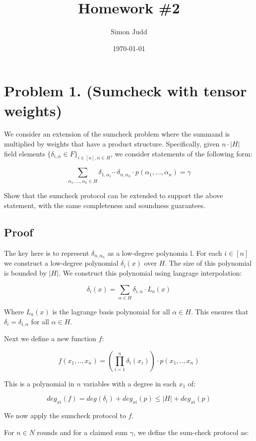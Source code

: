 \documentclass{article}
\title{Homework \#2}
\author{Simon Judd}
\date{\today}
\begin{document}
\maketitle

\section*{Problem 1. (Sumcheck with tensor weights)}

We consider an extension of the sumcheck problem where the summand is multiplied by weights that have a product structure. Specifically, given $n \cdot |H|$ field elements $\{\delta_{i,\alpha} \in F\}_{i\in[n],\alpha\in H}$, we consider statements of the following form:

\[
\sum_{\alpha_1,\ldots,\alpha_n \in H} \delta_{1,\alpha_1} \cdots \delta_{n,\alpha_n} \cdot p(\alpha_1, \ldots, \alpha_n) = \gamma
\]

Show that the sumcheck protocol can be extended to support the above statement, with the same completeness and soundness guarantees.


\subsection{Proof}

The key here is to represent $\delta_{n, \alpha_{n}}$ as a low-degree polynomia l.  For each $i \in [n]$ we construct a low-degree polynomial $\delta_{i}(x)$ over $H$.  The size of this polynomial is bounded by $|H|$.  We construct this polynomial using langrage interpolation:

$$
\delta_{i}(x) = \sum_{\alpha \in H} \delta_{i, \alpha} \cdot L_{a}(x)
$$

Where $L_{a}(x)$ is the lagrange basis polynomial for all $\alpha \in H$.  This ensures that $\delta_{i} = \delta_{i, \alpha}$ for all $\alpha \in H$.

Next we define a new function $f$:


$$
f(x_{1}, .., x_{n}) = (\prod_{i=1}^{n} \delta_{i}(x_{i})) \cdot p(x_{1},..,x_{n})
$$

This is a polynomial in $n$ variables with a degree in each $x_{1}$ of:

$$
deg_{xi}(f) = deg(\delta_{i}) + deg_{xi}(p) \le |H| + deg_{xi}(p)
$$

We now apply the sumcheck protocol to $f$.

For $n \in N$ rounds and for a claimed sum $\gamma$, we define the sum-check protocol as:
\end{document}
